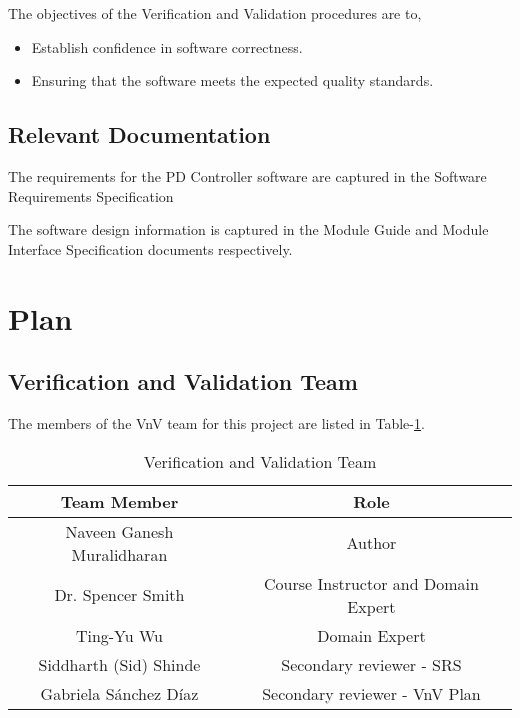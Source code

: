 \documentclass[12pt, titlepage]{article}
\begin{document}
The objectives of the Verification and Validation procedures are to,

\begin{itemize}
\item Establish confidence in software correctness.
\item Ensuring that the software meets the expected quality standards.
\end{itemize}

\subsection{Relevant Documentation}


The requirements for the PD Controller software are captured in the Software
Requirements Specification \cite{SRS}

The software design information is captured in the Module Guide  \cite{MG}
and Module Interface Specification \cite{MIS} documents respectively.

\section{Plan}
	
\subsection{Verification and Validation Team}


The members of the VnV team for this project are listed in Table-\ref{tab:VnVTeam}.

\begin{table}[]
\begin{tabular}{cc}
\hline
\multicolumn{1}{c|}{Team   Member} & Role \\ \hline
Naveen Ganesh Muralidharan      & Author    \\
Dr. Spencer Smith                     & Course Instructor and Domain Expert    \\
Ting-Yu Wu                               & Domain Expert    \\
Siddharth (Sid) Shinde               & Secondary reviewer - SRS    \\
Gabriela Sánchez Díaz	               & Secondary reviewer - VnV Plan \\   
\end{tabular}
\caption{Verification and Validation Team}
\label{tab:VnVTeam}
\end{table}
\end{document}

